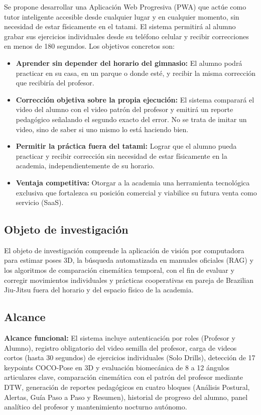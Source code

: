 \documentclass[12pt,letterpaper]{article}
\begin{document}
Se propone desarrollar una Aplicación Web Progresiva (PWA) que actúe como tutor inteligente accesible desde cualquier lugar y en cualquier momento, sin necesidad de estar físicamente en el tatami. El sistema permitirá al alumno grabar sus ejercicios individuales desde su teléfono celular y recibir correcciones en menos de 180 segundos. Los objetivos concretos son:
\begin{itemize}
    \item \textbf{Aprender sin depender del horario del gimnasio:} El alumno podrá practicar en su casa, en un parque o donde esté, y recibir la misma corrección que recibiría del profesor.
    \item \textbf{Corrección objetiva sobre la propia ejecución:} El sistema comparará el video del alumno con el video patrón del profesor y emitirá un reporte pedagógico señalando el segundo exacto del error. No se trata de imitar un video, sino de saber si uno mismo lo está haciendo bien.
    \item \textbf{Permitir la práctica fuera del tatami:} Lograr que el alumno pueda practicar y recibir corrección sin necesidad de estar físicamente en la academia, independientemente de su horario.
    \item \textbf{Ventaja competitiva:} Otorgar a la academia una herramienta tecnológica exclusiva que fortalezca su posición comercial y viabilice su futura venta como servicio (SaaS).
\end{itemize}

\subsection{Objeto de investigación}

El objeto de investigación comprende la aplicación de visión por computadora para estimar poses 3D, la búsqueda automatizada en manuales oficiales (RAG) y los algoritmos de comparación cinemática temporal, con el fin de evaluar y corregir movimientos individuales y prácticas cooperativas en pareja de Brazilian Jiu-Jitsu fuera del horario y del espacio físico de la academia.

\subsection{Alcance}

\textbf{Alcance funcional:} El sistema incluye autenticación por roles (Profesor y Alumno), registro obligatorio del video semilla del profesor, carga de videos cortos (hasta 30 segundos) de ejercicios individuales (Solo Drills), detección de 17 keypoints COCO-Pose en 3D y evaluación biomecánica de 8 a 12 ángulos articulares clave, comparación cinemática con el patrón del profesor mediante DTW, generación de reportes pedagógicos en cuatro bloques (Análisis Postural, Alertas, Guía Paso a Paso y Resumen), historial de progreso del alumno, panel analítico del profesor y mantenimiento nocturno autónomo.
\end{document}
